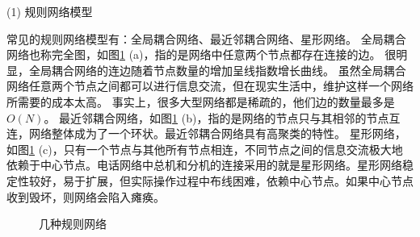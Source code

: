 (1) 规则网络模型

常见的规则网络模型有：全局耦合网络、最近邻耦合网络、星形网络。
全局耦合网络也称完全图，如图\ref{Fig2:several_network} (a)，指的是网络中任意两个节点都存在连接的边。
很明显，全局耦合网络的连边随着节点数量的增加呈线指数增长曲线。
虽然全局耦合网络任意两个节点之间都可以进行信息交流，但在现实生活中，维护这样一个网络所需要的成本太高。
事实上，很多大型网络都是稀疏的，他们边的数量最多是$ O(N) $。
最近邻耦合网络，如图\ref{Fig2:several_network} (b)，指的是网络的节点只与其相邻的节点互连，网络整体成为了一个环状。最近邻耦合网络具有高聚类的特性。
星形网络，如图\ref{Fig2:several_network} (c)，只有一个节点与其他所有节点相连，不同节点之间的信息交流极大地依赖于中心节点。电话网络中总机和分机的连接采用的就是星形网络。星形网络稳定性较好，易于扩展，但实际操作过程中布线困难，依赖中心节点。如果中心节点收到毁坏，则网络会陷入瘫痪。

\begin{figure}[ht]
	\centering
	\hfil
	\hfil
	
	\caption{几种规则网络}
	\label{Fig2:several_network}
\end{figure}




